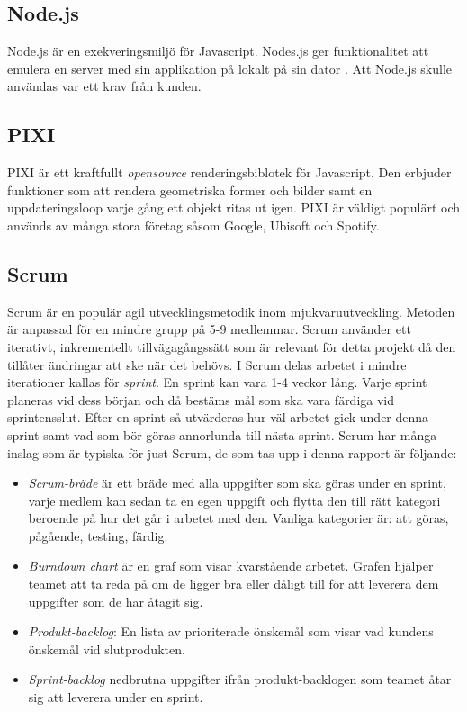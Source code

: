 \subsection*{Node.js}
Node.js är en exekveringsmiljö för Javascript. Nodes.js ger funktionalitet att emulera en server med sin applikation på lokalt på sin dator \cite{Node}. Att Node.js skulle användas var ett krav från kunden.

\subsection*{PIXI}
PIXI är ett kraftfullt \textit{opensource} renderingsbiblotek för Javascript\cite{Pixi}. Den erbjuder funktioner som att rendera geometriska former och bilder samt en uppdateringsloop varje gång ett objekt ritas ut igen. PIXI är väldigt populärt och används av många stora företag såsom Google, Ubisoft och Spotify. 

\subsection*{Scrum}
Scrum är en populär agil utvecklingsmetodik inom mjukvaruutveckling. Metoden är anpassad för en mindre grupp på 5-9 medlemmar. Scrum använder ett iterativt, inkrementellt tillvägagångssätt som är relevant för detta projekt då den tillåter ändringar att ske när det behövs\cite{TheScrum81:online}. I Scrum delas arbetet i mindre iterationer kallas för \textit{sprint}. En sprint kan vara 1-4 veckor lång. Varje sprint planeras vid dess början och då bestäms mål som ska vara färdiga vid sprintensslut. Efter en sprint så utvärderas hur väl arbetet gick under denna sprint samt vad som bör göras annorlunda till nästa sprint. Scrum har många inslag som är typiska för just Scrum, de som tas upp i denna rapport är följande:

\begin{itemize}
	\item \textit{Scrum-bräde} är ett bräde med alla uppgifter som ska göras under en sprint, varje medlem kan sedan ta en egen uppgift och flytta den till rätt kategori beroende på hur det går i arbetet med den. Vanliga kategorier är: att göras, pågående, testing, färdig.
	
	\item \textit{Burndown chart} är en graf som visar kvarstående arbetet. Grafen hjälper teamet att ta reda på om de ligger bra eller dåligt till för att leverera dem uppgifter som de har åtagit sig. 
	
	\item \textit{Produkt-backlog}: En lista av prioriterade önskemål som visar vad kundens önskemål vid slutprodukten.
	
	\item \textit{Sprint-backlog} nedbrutna uppgifter ifrån produkt-backlogen som teamet åtar sig att leverera under en sprint. 	
	
\end{itemize}

